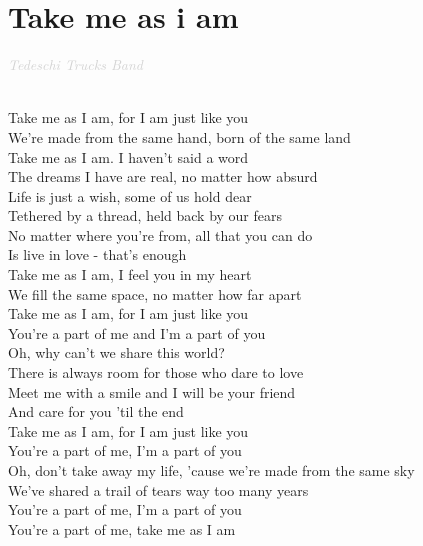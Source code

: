 \documentclass[a5paper, 10pt]{book}
\begin{document}
\section{Take me as i am}\textcolor{lightgray}{\textit{Tedeschi Trucks Band}}\\~\\
\begin{minipage}[t]{0.8\textwidth}
  Take me as I am, for I am just like you\\
  We're made from the same hand, born of the same land\\
  Take me as I am. I haven't said a word\\
  The dreams I have are real, no matter how absurd\\

  \hspace*{5mm}Life is just a wish, some of us hold dear\\
  \hspace*{5mm}Tethered by a thread, held back by our fears\\
  \hspace*{5mm}No matter where you're from, all that you can do\\
  \hspace*{5mm}Is live in love - that's enough\\

  Take me as I am, I feel you in my heart\\
  We fill the same space, no matter how far apart\\
  Take me as I am, for I am just like you\\
  You're a part of me and I'm a part of you\\

  \hspace*{5mm}Oh, why can't we share this world?\\
  \hspace*{5mm}There is always room for those who dare to love\\
  \hspace*{5mm}Meet me with a smile and I will be your friend\\
  \hspace*{5mm}And care for you 'til the end\\

  Take me as I am, for I am just like you\\
  You're a part of me, I'm a part of you\\
  Oh, don't take away my life, 'cause we're made from the same sky\\
  We've shared a trail of tears way too many years\\

  You're a part of me, I'm a part of you\\
  You're a part of me, take me as I am\\

\end{minipage}
\end{document}
